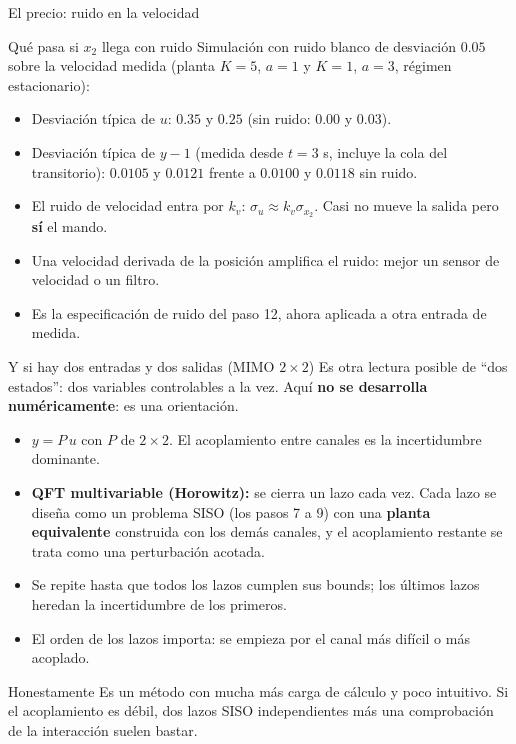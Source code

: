 \documentclass[aspectratio=169,11pt]{beamer}
\begin{document}
\begin{frame}{El precio: ruido en la velocidad}
  \small
  \begin{block}{Qué pasa si $x_2$ llega con ruido}
    Simulación con ruido blanco de desviación $0.05$ sobre la velocidad medida (planta $K=5$, $a=1$ y $K=1$, $a=3$, régimen estacionario):
    \begin{itemize}
      \item Desviación típica de $u$: $0.35$ y $0.25$ (sin ruido: $0.00$ y $0.03$).
      \item Desviación típica de $y-1$ (medida desde $t=3$ s, incluye la cola del transitorio): $0.0105$ y $0.0121$ frente a $0.0100$ y $0.0118$ sin ruido.
    \end{itemize}
  \end{block}
  \begin{itemize}
    \item El ruido de velocidad entra por $k_v$: $\sigma_u\approx k_v\sigma_{x_2}$. Casi no mueve la salida pero \textbf{sí} el mando.
    \item Una velocidad derivada de la posición amplifica el ruido: mejor un sensor de velocidad o un filtro.
    \item Es la especificación de ruido del paso 12, ahora aplicada a otra entrada de medida.
  \end{itemize}
\end{frame}

\begin{frame}{Y si hay dos entradas y dos salidas (MIMO $2\times2$)}
  \small
  Es otra lectura posible de ``dos estados'': dos variables controlables a la vez. Aquí \textbf{no se desarrolla numéricamente}: es una orientación.
  \begin{itemize}
    \item $y=P\,u$ con $P$ de $2\times2$. El acoplamiento entre canales es la incertidumbre dominante.
    \item \textbf{QFT multivariable (Horowitz):} se cierra un lazo cada vez. Cada lazo se diseña como un problema SISO (los pasos 7 a 9) con una \textbf{planta equivalente} construida con los demás canales, y el acoplamiento restante se trata como una perturbación acotada.
    \item Se repite hasta que todos los lazos cumplen sus bounds; los últimos lazos heredan la incertidumbre de los primeros.
    \item El orden de los lazos importa: se empieza por el canal más difícil o más acoplado.
  \end{itemize}
  \begin{alertblock}{Honestamente}
    Es un método con mucha más carga de cálculo y poco intuitivo. Si el acoplamiento es débil, dos lazos SISO independientes más una comprobación de la interacción suelen bastar.
  \end{alertblock}
\end{frame}
\end{document}
